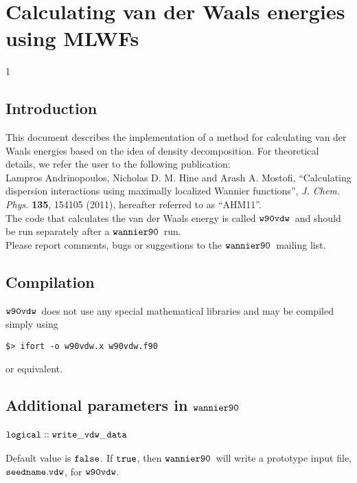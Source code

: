 \documentclass{report}
\newcommand{\wvdw}{{$\tt{w90vdw}$}}
\newcommand{\wannier}{{$\tt{wannier90}$}}
\begin{document}
\normalsize

\chapter*{Calculating van der Waals energies using MLWFs}
\addtocounter {chapter} {1}

\section{Introduction}

This document describes the implementation of a method for calculating
van der Waals energies based on the idea of density decomposition. For
theoretical details, we refer the user to the following publication:\\

Lampros Andrinopoulos, Nicholas D. M. Hine and Arash A. Mostofi,
``Calculating dispersion interactions using maximally localized Wannier functions'',
\emph{J. Chem. Phys.} \textbf{135}, 154105 (2011), hereafter referred
to as ``AHM11''. \\

The code that calculates the van der Waals energy is called
\wvdw\ and should be run separately after a \wannier\ run.\\

Please report comments, bugs or suggestions to the \wannier\ mailing
list. 

\section{Compilation}

\wvdw\ does not use any special mathematical libraries and may be
compiled simply using

\begin{verbatim}
$> ifort -o w90vdw.x w90vdw.f90
\end{verbatim}

or equivalent.

\section{Additional parameters in \wannier}

\subsection{$\tt{logical :: write\_vdw\_data}$}
 
Default value is $\tt{false}$. If $\tt{true}$, then \wannier\ will
write a prototype input file, $\tt{seedname.vdw}$, for
\wvdw. 
\end{document}
